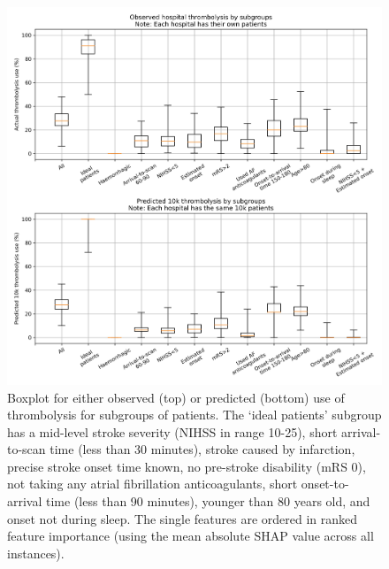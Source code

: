 
\begin{figure}[!h]
\centering
\includegraphics[width=1\textwidth]{./images/15a_xgb_10_features_10k_cohort_actual_vs_modelled_subgroup_boxplot}
\caption{Boxplot for either observed (top) or predicted (bottom) use of thrombolysis for subgroups of patients. The `ideal patients' subgroup has a mid-level stroke severity (NIHSS in range 10-25), short arrival-to-scan time (less than 30 minutes), stroke caused by infarction, precise stroke onset time known, no pre-stroke disability (mRS 0), not taking any atrial fibrillation anticoagulants, short onset-to-arrival time (less than 90 minutes), younger than 80 years old, and onset not during sleep. The single features are ordered in ranked feature importance (using the mean absolute SHAP value across all instances). }
\label{fig:results_boxplot}
\end{figure}
\newpage





